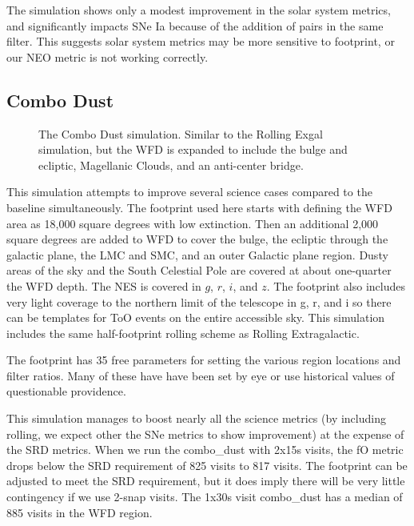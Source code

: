 The simulation shows only a modest improvement in the solar system metrics, and significantly impacts SNe Ia because of the addition of pairs in the same filter. This suggests solar system metrics may be more sensitive to footprint, or our NEO metric is not working correctly.

\subsection{Combo Dust}

\begin{figure}
\caption{The Combo Dust simulation. Similar to the Rolling Exgal simulation, but the WFD is expanded to include the bulge and ecliptic, Magellanic Clouds, and an anti-center bridge.  }\label{fig:combodust}
\end{figure}


This simulation attempts to improve several science cases compared to the baseline simultaneously. The footprint used here starts with defining the WFD area as 18,000 square degrees with low extinction. Then an additional 2,000 square degrees are added to WFD to cover the bulge, the ecliptic through the galactic plane, the LMC and SMC, and an outer Galactic plane region. Dusty areas of the sky and the South Celestial Pole are covered at about one-quarter the WFD depth. The NES is covered in $g$, $r$, $i$, and $z$. The footprint also includes very light coverage to the northern limit of the telescope in g, r, and i so there can be templates for ToO events on the entire accessible sky. This simulation includes the same half-footprint rolling scheme as Rolling Extragalactic.

The footprint has 35 free parameters for setting the various region locations and filter ratios. Many of these have have been set by eye or use historical values of questionable providence. 

This simulation manages to boost nearly all the science metrics (by including rolling, we expect other the SNe metrics to show improvement) at the expense of the SRD metrics. When we run the combo\_dust with 2x15s visits, the fO metric drops below the SRD requirement of 825 visits to 817 visits. The footprint can be adjusted to meet the SRD requirement, but it does imply there will be very little contingency if we use 2-snap visits. The 1x30s visit combo\_dust has a median of 885 visits in the WFD region.

